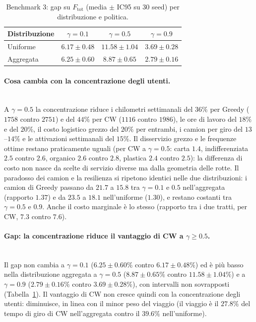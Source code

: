 \begin{table}[htbp]
	\centering
	\caption{Benchmark 3: gap su $F_{\mathrm{tot}}$ (media $\pm$ IC95 su 30 seed) per distribuzione e politica.}
	\label{tab:b3_gap}
	\small
	\begin{tabular}{lccc}
		\hline
		Distribuzione & $\gamma=0.1$ & $\gamma=0.5$ & $\gamma=0.9$ \\
		\hline
		Uniforme  & $6.17\pm0.48$ & $11.58\pm1.04$ & $3.69\pm0.28$ \\
		Aggregata & $6.25\pm0.60$ & $8.87\pm0.65$  & $2.79\pm0.16$ \\
		\hline
	\end{tabular}
\end{table}

\paragraph{Cosa cambia con la concentrazione degli utenti.}\mbox{}\\
A $\gamma=0.5$ la concentrazione riduce i chilometri settimanali del $36\%$ per Greedy ($1758$ contro $2751$) e del $44\%$ per CW ($1116$ contro $1986$), le ore di lavoro del $18\%$ e del $20\%$, il costo logistico grezzo del $20\%$ per entrambi, i camion per giro del $13$--$14\%$ e le attivazioni settimanali del $15\%$. Il disservizio grezzo e le frequenze ottime restano praticamente uguali (per CW a $\gamma=0.5$: carta $1.4$, indifferenziata $2.5$ contro $2.6$, organico $2.6$ contro $2.8$, plastica $2.4$ contro $2.5$): la differenza di costo non nasce da scelte di servizio diverse ma dalla geometria delle rotte. Il paradosso dei camion e la resilienza si ripetono identici nelle due distribuzioni: i camion di Greedy passano da $21.7$ a $15.8$ tra $\gamma=0.1$ e $0.5$ nell'aggregata (rapporto $1.37$) e da $23.5$ a $18.1$ nell'uniforme ($1.30$), e restano costanti tra $\gamma=0.5$ e $0.9$. Anche il costo marginale è lo stesso (rapporto tra i due tratti, per CW, $7.3$ contro $7.6$).

\paragraph{Gap: la concentrazione riduce il vantaggio di CW a $\gamma\ge0.5$.}\mbox{}\\
Il gap non cambia a $\gamma=0.1$ ($6.25\pm0.60\%$ contro $6.17\pm0.48\%$) ed è più basso nella distribuzione aggregata a $\gamma=0.5$ ($8.87\pm0.65\%$ contro $11.58\pm1.04\%$) e a $\gamma=0.9$ ($2.79\pm0.16\%$ contro $3.69\pm0.28\%$), con intervalli non sovrapposti (Tabella~\ref{tab:b3_gap}). Il vantaggio di CW non cresce quindi con la concentrazione degli utenti: diminuisce, in linea con il minor peso del viaggio (il viaggio è il $27.8\%$ del tempo di giro di CW nell'aggregata contro il $39.6\%$ nell'uniforme).

